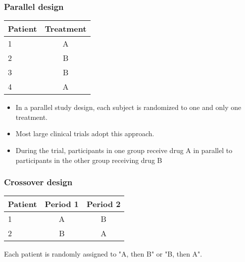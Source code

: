 \documentclass[table,10pt]{beamer}
\begin{document}
\begin{CJK*}{UTF8}{gbsn}
\begin{frame}[t]
\frametitle{Parallel design}
\begin{table}
\begin{tabular}{lc}
\hline
\textbf{Patient} & \textbf{Treatment}\\
\hline
1 & A\\
2 & B\\
3 & B\\
4 & A\\
\hline
\end{tabular}
\end{table}
\begin{itemize}
	\item In a parallel study design, each subject is randomized to one 
		and only one treatment.
	\item Most large clinical trials adopt this approach.
	\item During the trial, participants in one group receive drug A \alert{
		in parallel} to participants in the other group receiving drug B
\end{itemize}
\end{frame}


\begin{frame}[t]
\frametitle{Crossover design}
\begin{table}
\begin{tabular}{lcc}
\hline
\textbf{Patient} & \textbf{Period 1} & \textbf{Period 2}\\
\hline
1 & A & B\\
2 & B & A\\
\hline
\end{tabular}
\end{table}
Each patient is randomly assigned to "A, then B" or "B, then A".


\end{frame}
\end{CJK*}
\end{document}
